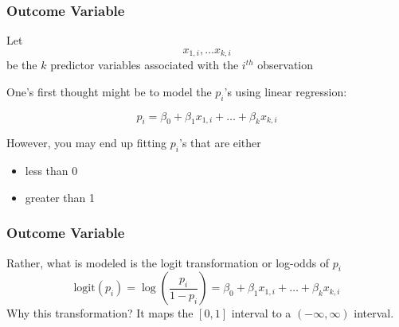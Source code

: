 \documentclass[slides]{beamer}
\newcommand{\blue}[1]{\textcolor{blue2}{#1}}
\begin{document}
\begin{frame}[fragile]
\frametitle{Outcome Variable}

Let
\[
x_{1,i}, \ldots x_{k,i}
\]
be the $k$ predictor variables associated with the $i^{th}$ observation

\vspace{0.5cm}
\pause
One's first thought might be to model the $p_i$'s using linear regression:

\[
p_i = \beta_0 + \beta_1 x_{1,i} + \ldots + \beta_k x_{k,i}
\]

\vspace{0.5cm}
\pause
However, you may end up fitting $p_i$'s that are either
\begin{itemize}
\item less than 0
\item greater than 1
\end{itemize}

\end{frame}




\begin{frame}[fragile]
\frametitle{Outcome Variable}
Rather, what is modeled is the \blue{logit transformation} or \blue{log-odds} of $p_i$
\[
\mbox{logit}(p_i) = \log\left(
\frac{p_i}{1-p_i}
\right) = \beta_0 + \beta_1 x_{1,i} + \ldots + \beta_k x_{k,i}
\]
\pause
Why this transformation?  It maps the $[0,1]$ interval to a $(-\infty, \infty)$ interval.  
\end{frame}
\end{document}
